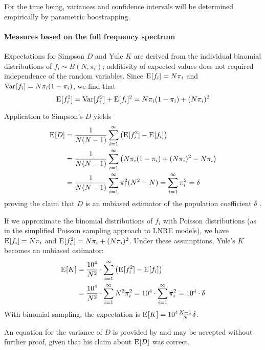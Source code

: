 \documentclass[a4paper]{article}
\begin{document}
For the time being, variances and confidence intervals will be determined
empirically by parametric boostrapping.

\paragraph*{Measures based on the full frequency spectrum}
Expectations for Simpson $D$ and Yule $K$ are derived from the individual
binomial distributions of $f_i \sim B(N, \pi_i)$; additivity of expected
values does not required independence of the random variables.  Since
$\mathrm{E}_{}[f_i] = N \pi_i$ and $\mathop{\mathrm{Var}}_{}[f_i] = N \pi_i (1 - \pi_i)$, we find that
\begin{equation}
  \label{eq:prod:exp-D-1}
  \mathrm{E}_{}[f_i^2] = \mathop{\mathrm{Var}}_{}[f_i^2] + \mathrm{E}_{}[f_i]^2 = N \pi_i (1 - \pi_i) + (N \pi_i)^2
\end{equation}
Application to Simpson's $D$ yields
\begin{align*}
  \mathrm{E}_{}[D] & = \frac1{N(N-1)} \sum_{i=1}^{\infty} \left( \mathrm{E}_{}[f_i^2] - \mathrm{E}_{}[f_i] \right)\\
          & = \frac1{N(N-1)} \sum_{i=1}^{\infty} \left( N \pi_i (1 - \pi_i) + (N \pi_i)^2 - N \pi_i \right)\\
          & = \frac1{N(N-1)} \sum_{i=1}^{\infty} \pi_i^2 (N^2 - N)
            = \sum_{i=1}^{\infty} \pi_i^2 = \delta
\end{align*}
proving the claim that $D$ is an unbiased estimator of the population
coefficient $\delta$ \citep[688]{Simpson:49}.  

If we approximate the binomial distributions of $f_i$ with Poisson
distributions (as in the simplified Poisson sampling approach to LNRE models),
we have $\mathrm{E}_{}[f_i] = N \pi_i$ and $\mathrm{E}_{}[f_i^2] = N \pi_i + (N \pi_i)^2$. Under
these assumptions, Yule's $K$ becomes an unbiased estimator:
\begin{align*}
  \mathrm{E}_{}[K] & = \frac{10^4}{N^2} \cdot \sum_{i=1}^{\infty} \left( \mathrm{E}_{}[f_i^2] - \mathrm{E}_{}[f_i] \right) \\
          & = \frac{10^4}{N^2} \cdot \sum_{i=1}^{\infty} N^2 \pi_i^2
            = 10^4 \cdot \sum_{i=1}^{\infty} \pi_i^2 = 10^4 \cdot \delta
\end{align*}
With binomial sampling, the expectation is $\mathrm{E}_{}[K] = 10^4 \frac{N - 1}{N} \delta$.

An equation for the variance of $D$ is provided by \citet[688]{Simpson:49} and
may be accepted without further proof, given that his claim about $\mathrm{E}_{}[D]$
was correct.


\end{document}

